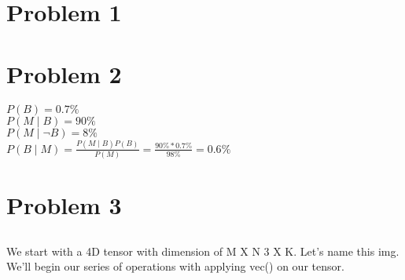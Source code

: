 \documentclass{article}
\begin{document}
\section{Problem 1}
	\subsection{} %
	\subsection{} %
	\subsection{} %

\section {Problem 2}
	$P(B) = 0.7\%$\\
	$P(M \mid B) = 90\%$\\
	$P(M \mid \neg B) = 8\%$\\
	$P(B \mid M)  = \frac{P(M \mid B) P(B)}{P(M)} = \frac{90\% * 0.7\%}{98\%} = \mathbf{0.6\%}$

\section {Problem 3}
	\subsection{} %
		\subsubsection{} %
		\subsubsection{} %
	\subsection{} %
		\subsubsection{} %
		We start with a 4D tensor with dimension of M X N 3 X K. Let's name this img. 
		We'll begin our series of operations with applying vec() on our tensor.\\
\end{document}
